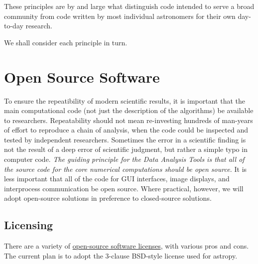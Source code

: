 \documentclass[letterpaper,10pt,english]{sphinxmanual}
\begin{document}
These principles are by and large what distinguish
code intended to serve a broad community from code written by most individual
astronomers for their own day-to-day research.

We shall consider each principle in turn.


\section{Open Source Software}
\label{intro:open-source-software}
To ensure the repeatibility of modern scientific results, it is important that
the main computational code (not just the description of the algorithms) be
available to researchers. Repeatability should not mean re-investing hundreds of
man-years of effort to reproduce a chain of analysis, when the code could be
inspected and tested by independent researchers. Sometimes the error in a scientific
finding is not the result of a deep error of scientific judgment, but rather a
simple typo in computer code. \emph{The guiding principle for the Data Analysis Tools
is that all of the source code for the core numerical computations should be
open source.} It is less important that all of the code for GUI interfaces, image displays,
and interprocess communication be open source. Where practical, however, we will
adopt open-source solutions in preference to closed-source solutions.


\subsection{Licensing}
\label{intro:licensing}
There are a variety of \href{http://opensource.org/licenses}{open-source software licenses},
with various pros and cons.  The current plan is to adopt the 3-clause BSD-style license used for astropy.
\end{document}
